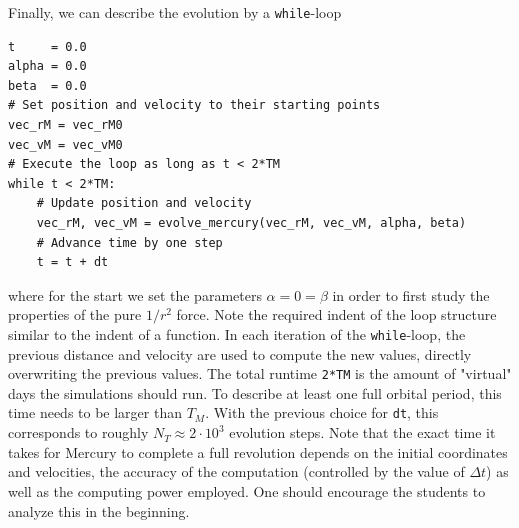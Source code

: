 \documentclass[12pt,ngerman,american]{iopart}
\begin{document}
Finally, we can describe the evolution by a \texttt{while}-loop
\begin{lstlisting}
t     = 0.0
alpha = 0.0
beta  = 0.0
# Set position and velocity to their starting points
vec_rM = vec_rM0
vec_vM = vec_vM0
# Execute the loop as long as t < 2*TM
while t < 2*TM:
    # Update position and velocity
    vec_rM, vec_vM = evolve_mercury(vec_rM, vec_vM, alpha, beta)
    # Advance time by one step
    t = t + dt
\end{lstlisting}
where for the start we set the parameters $\alpha=0 = \beta$ in order to first study the properties of the pure
$1/r^2$ force.
Note the required indent of the loop structure similar to the indent of a function.
In each iteration of the \texttt{while}-loop, the previous distance and velocity are used to compute the new values,
directly overwriting the previous values.
The total runtime \texttt{2*TM} is the amount of "virtual" days the simulations should run.
To describe at least one full orbital period, this time needs to be larger than $T_M$.
With the previous choice for \texttt{dt}, this corresponds to roughly $N_T \approx 2 \cdot 10^3$ evolution steps.
Note that the exact time it takes for Mercury to complete a full revolution depends on the initial coordinates and velocities, the accuracy of the computation
(controlled by the value of $\Delta t$) as well as the computing power employed.
One should encourage the students to analyze this in the beginning.

\end{document}
